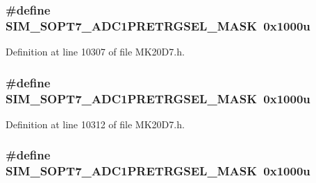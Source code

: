 \subsubsection[{\texorpdfstring{S\+I\+M\+\_\+\+S\+O\+P\+T7\+\_\+\+A\+D\+C1\+P\+R\+E\+T\+R\+G\+S\+E\+L\+\_\+\+M\+A\+SK}{SIM_SOPT7_ADC1PRETRGSEL_MASK}}]{\setlength{\rightskip}{0pt plus 5cm}\#define S\+I\+M\+\_\+\+S\+O\+P\+T7\+\_\+\+A\+D\+C1\+P\+R\+E\+T\+R\+G\+S\+E\+L\+\_\+\+M\+A\+SK~0x1000u}\hypertarget{group___s_i_m___register___masks_gad5a05f77e88118ff1b5c02e4a756f527}{}\label{group___s_i_m___register___masks_gad5a05f77e88118ff1b5c02e4a756f527}


Definition at line 10307 of file M\+K20\+D7.\+h.

\subsubsection[{\texorpdfstring{S\+I\+M\+\_\+\+S\+O\+P\+T7\+\_\+\+A\+D\+C1\+P\+R\+E\+T\+R\+G\+S\+E\+L\+\_\+\+M\+A\+SK}{SIM_SOPT7_ADC1PRETRGSEL_MASK}}]{\setlength{\rightskip}{0pt plus 5cm}\#define S\+I\+M\+\_\+\+S\+O\+P\+T7\+\_\+\+A\+D\+C1\+P\+R\+E\+T\+R\+G\+S\+E\+L\+\_\+\+M\+A\+SK~0x1000u}\hypertarget{group___s_i_m___register___masks_gad5a05f77e88118ff1b5c02e4a756f527}{}\label{group___s_i_m___register___masks_gad5a05f77e88118ff1b5c02e4a756f527}


Definition at line 10312 of file M\+K20\+D7.\+h.

\subsubsection[{\texorpdfstring{S\+I\+M\+\_\+\+S\+O\+P\+T7\+\_\+\+A\+D\+C1\+P\+R\+E\+T\+R\+G\+S\+E\+L\+\_\+\+M\+A\+SK}{SIM_SOPT7_ADC1PRETRGSEL_MASK}}]{\setlength{\rightskip}{0pt plus 5cm}\#define S\+I\+M\+\_\+\+S\+O\+P\+T7\+\_\+\+A\+D\+C1\+P\+R\+E\+T\+R\+G\+S\+E\+L\+\_\+\+M\+A\+SK~0x1000u}\hypertarget{group___s_i_m___register___masks_gad5a05f77e88118ff1b5c02e4a756f527}{}\label{group___s_i_m___register___masks_gad5a05f77e88118ff1b5c02e4a756f527}


